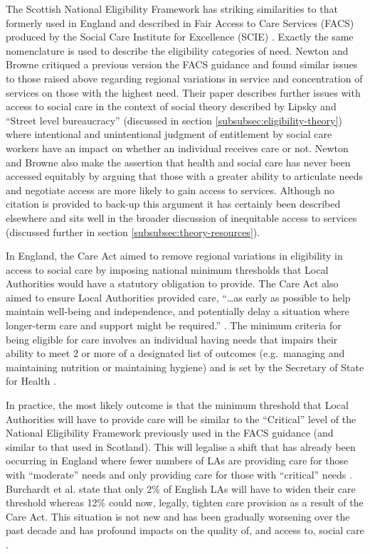 \documentclass[12pt,]{report}
\begin{document}
The Scottish National Eligibility Framework has striking similarities to
that formerly used in England and described in Fair Access to Care
Services (FACS) produced by the Social Care Institute for Excellence
(SCIE) \citeyearpar{RN138}. Exactly the same nomenclature is used to
describe the eligibility categories of need. Newton and Browne
\citeyearpar{RN163} critiqued a previous version the FACS guidance and
found similar issues to those raised above regarding regional variations
in service and concentration of services on those with the highest need.
Their paper describes further issues with access to social care in the
context of social theory described by Lipsky \citeyearpar{RN174} and
``Street level bureaucracy'' (discussed in section
\ref{subsubsec:eligibility-theory}) where intentional and unintentional
judgment of entitlement by social care workers have an impact on whether
an individual receives care or not. Newton and Browne
\citeyearpar{RN163} also make the assertion that health and social care
has never been accessed equitably by arguing that those with a greater
ability to articulate needs and negotiate access are more likely to gain
access to services. Although no citation is provided to back-up this
argument it has certainly been described elsewhere \citep{RN118} and
sits well in the broader discussion of inequitable access to services
\citep{RN116, RN175, RN120} (discussed further in section
\ref{subsubsec:theory-resources}).

In England, the Care Act \citeyearpar{RN176} aimed to remove regional
variations in eligibility in access to social care by imposing national
minimum thresholds that Local Authorities would have a statutory
obligation to provide. The Care Act also aimed to ensure Local
Authorities provided care, ``\ldots{}as early as possible to help
maintain well-being and independence, and potentially delay a situation
where longer-term care and support might be required.''
\citep[pp.2]{RN169}. The minimum criteria for being eligible for care
involves an individual having needs that impairs their ability to meet 2
or more of a designated list of outcomes (e.g.~managing and maintaining
nutrition or maintaining hygiene) \citep{RN169} and is set by the
Secretary of State for Health \citep{RN177}.

In practice, the most likely outcome is that the minimum threshold that
Local Authorities will have to provide care will be similar to the
``Critical'' level of the National Eligibility Framework previously used
in the FACS guidance \citep{RN173, RN177} (and similar to that used in
Scotland). This will legalise a shift that has already been occurring in
England where fewer numbers of LAs are providing care for those with
``moderate'' needs and only providing care for those with ``critical''
needs \citep{RN173, RN177}. Burchardt et al. \citeyearpar{RN173} state
that only 2\% of English LAs will have to widen their care threshold
whereas 12\% could now, legally, tighten care provision as a result of
the Care Act. This situation is not new and has been gradually worsening
over the past decade and has profound impacts on the quality of, and
access to, social care \citep{RN374}.
\end{document}
